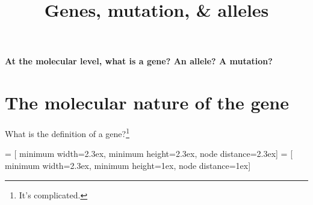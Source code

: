 



% 

\title[Genes, mutation, \& alleles]{Genes, mutation, \& alleles}
\date{}



\maketitle

\begin{frame}
\textbf{At the molecular level, what is a gene? An allele? A mutation?} \\
\end{frame}

\section{The molecular nature of the gene}

\begin{frame}[t]

    {\Large What is the definition of a gene?}\footnote{\tiny It's complicated.}


\end{frame}

 = [
    minimum width=2.3ex, minimum height=2.3ex, node distance=2.3ex]
 = [
    minimum width=2.3ex, minimum height=1ex, node distance=1ex]

